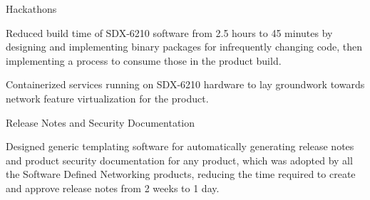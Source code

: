 
\begin{cventries}
  \cventry
    {} {Hackathons} {} {} {
      \begin{cvitems}
      \item {Reduced build time of SDX-6210 software from 2.5 hours to 45 minutes by designing and implementing binary packages for infrequently changing code, then implementing a process to consume those in the product build.}
      \item {Containerized services running on SDX-6210 hardware to lay groundwork towards network feature virtualization for the product.}
      \end{cvitems}
    }

  \cventry
    {} {Release Notes and Security Documentation} {} {} {
      \begin{cvitems}
        \item {Designed generic templating software for automatically generating release notes and product security documentation for any product, which was adopted by all the Software Defined Networking products, reducing the time required to create and approve release notes from 2 weeks to 1 day.}
      \end{cvitems}
    }


\end{cventries}
